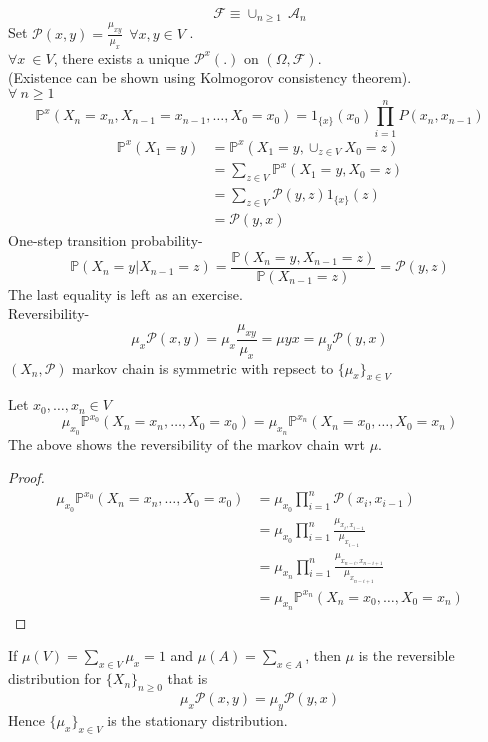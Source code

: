 \documentclass[main]{subfiles}
\begin{document}
$$\mathcal{F} \equiv \cup_{n \geq 1} ~ \mathcal{A}_n$$
Set $\mathcal{P} (x,y)=\frac{\mu_{xy}}{\mu_x} ~~ \forall x,y \in V$ .\\
$\forall x\ \in V$, there exists a unique $\mathcal{P}^x (.)$ on $(\Omega,\mathcal{F})$. \\
(Existence can be shown using Kolmogorov consistency theorem). \\
$\forall~ n \geq 1$
$$\mathbb{P}^x (X_n=x_n,X_{n-1}=x_{n-1},\ldots, X_0=x_0)= 1_{\{x\}} (x_0) \prod_{i=1}^n P(x_n, x_{n-1})$$
\begin{align*}
  \mathbb{P}^x (X_1=y) & = \mathbb{P}^x (X_1=y, \cup_{z \in V} X_0 =z)   \\
                       & = \sum_{z \in V} \mathbb{P}^x (X_1=y, X_0=z)    \\
                       & = \sum_{z \in V} \mathcal{P} (y,z) 1_{\{x\}}(z) \\
                       & = \mathcal{P} (y,x)
\end{align*}
One-step transition probability-
$$ \mathbb{P}(X_n=y | X_{n-1}=z) =\frac{\mathbb{P}(X_n=y, X_{n-1}=z)}{\mathbb{P} (X_{n-1}=z)} =\mathcal{P} (y,z)$$
The last equality is left as an exercise.\\
Reversibility-
$$\mu_x \mathcal{P} (x,y) =\mu_x \frac{\mu_{xy}}{\mu_x} =\mu{yx} =\mu_y \mathcal{P} (y,x)$$
$(X_n,\mathcal{P})$ markov chain is symmetric with repsect to $\{\mu_x\}_{x \in V}$ \\
\begin{lemma} Let $x_0, \ldots, x_n \in V$
  $$\mu_{x_0} \mathbb{P}^{x_0} (X_n=x_n, \ldots, X_0=x_0)=\mu_{x_n} \mathbb{P}^{x_n} (X_n=x_0, \ldots, X_0=x_n)$$
  The above shows the reversibility of the markov chain wrt $\mu$. \end{lemma}
\begin{proof}
  \begin{align*}
    \mu_{x_0} \mathbb{P}^{x_0} (X_n=x_n, \ldots, X_0=x_0) & = \mu_{x_0} \prod_{i=1}^n \mathcal{P} (x_i,x_{i-1})                       \\
                                                          & = \mu_{x_0} \prod_{i=1}^n \frac{\mu_{x_i,x_{i-1}}}{\mu_{x_{i-1}}}         \\
                                                          & = \mu_{x_n} \prod_{i=1}^n \frac{\mu_{x_{n-i},x_{n-i+1}}}{\mu_{x_{n-i+1}}} \\
                                                          & =\mu_{x_n} \mathbb{P}^{x_n} (X_n=x_0, \ldots, X_0=x_n)
  \end{align*}
\end{proof}
\begin{remark} If $\mu(V) =\sum_{x \in V} \mu_x=1$ and $\mu(A)= \sum_{x \in A}$, then $\mu$ is the reversible distribution for $\{X_n\}_{n \geq 0}$ that is
  $$\mu_x \mathcal{P} (x,y)= \mu_y \mathcal{P} (y,x)$$
  Hence $\{\mu_x\}_{x \in V}$ is the stationary distribution.\end{remark}
\end{document}
